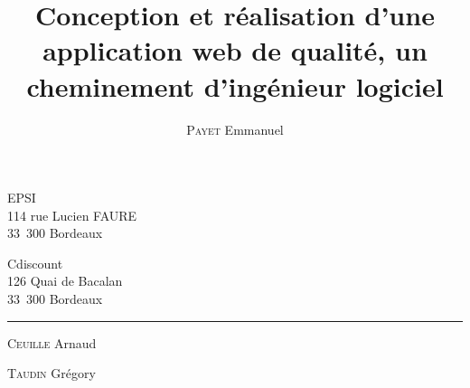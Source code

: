 \newcommand*{\TitleStyle}[1]{%
      \usefont{\encodingdefault}{\rmdefault}{b}{n}%
      \fontsize{17}{20}%
      \selectfont%
      \textbf{#1}}

\title{\TitleStyle{Conception et réalisation d’une application web de qualité, un cheminement d’ingénieur logiciel}}
\author{\textsc{Payet} Emmanuel}
\makeatletter

\vspace*{1cm}
\begin{minipage}{.5\textwidth}
    EPSI\\
     114 rue Lucien FAURE\\
     33 300 Bordeaux
\end{minipage}
\begin{minipage}{.5\textwidth}
    \begin{flushright}
        Cdiscount\\
        126 Quai de Bacalan\\
        33 300 Bordeaux
    \end{flushright}
\end{minipage}

\begin{center}
    \vspace*{7cm}
    \textsc{\@title}
    \HRule
    \vspace*{0.5cm}
    \large{\@author}
\end{center}

\vfill

\rule{\textwidth}{0.2mm}
\begin{minipage}{.33\textwidth}
    \textsc{Ceuille} Arnaud
\end{minipage}
\begin{minipage}{.33\textwidth}
    \begin{center}
        \@date
    \end{center}
\end{minipage}
\begin{minipage}{.33\textwidth}
    \begin{flushright}
        \textsc{Taudin} Grégory
    \end{flushright}
\end{minipage}
